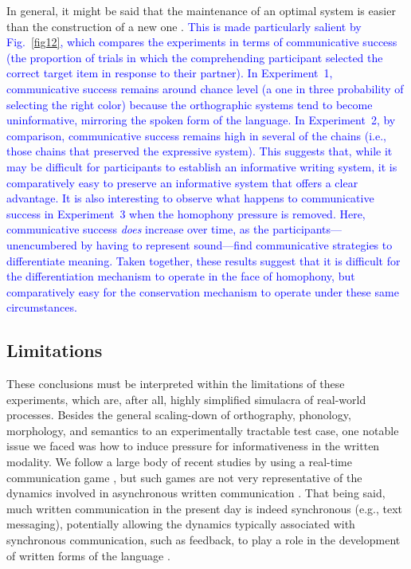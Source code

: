 \documentclass[doc,biblatex]{apa7}
\newcommand\newmaterial[1]{\textcolor{blue}{#1}}
\begin{document}
In general, it might be said that the maintenance of an optimal system is easier than the construction of a new one \parencite[see also][]{Smith:2002}. \newmaterial{This is made particularly salient by Fig.~\ref{fig12}, which compares the experiments in terms of communicative success (the proportion of trials in which the comprehending participant selected the correct target item in response to their partner). In Experiment~1, communicative success remains around chance level (a one in three probability of selecting the right color) because the orthographic systems tend to become uninformative, mirroring the spoken form of the language. In Experiment~2, by comparison, communicative success remains high in several of the chains (i.e., those chains that preserved the expressive system). This suggests that, while it may be difficult for participants to establish an informative writing system, it is comparatively easy to preserve an informative system that offers a clear advantage. It is also interesting to observe what happens to communicative success in Experiment~3 when the homophony pressure is removed. Here, communicative success \textit{does} increase over time, as the participants---unencumbered by having to represent sound---find communicative strategies to differentiate meaning. Taken together, these results suggest that it is difficult for the differentiation mechanism to operate in the face of homophony, but comparatively easy for the conservation mechanism to operate under these same circumstances.}

\subsection{Limitations}

These conclusions must be interpreted within the limitations of these experiments, which are, after all, highly simplified simulacra of real-world processes. Besides the general scaling-down of orthography, phonology, morphology, and semantics to an experimentally tractable test case, one notable issue we faced was how to induce pressure for informativeness in the written modality. We follow a large body of recent studies by using a real-time communication game \parencite[e.g.,][]{Carr:2017, Kanwal:2017, Kirby:2015, Raviv:2018, Saldana:2019, Silvey:2019, Winters:2015}, but such games are not very representative of the dynamics involved in asynchronous written communication \parencite[although see][for some approaches]{Winters:2019}. That being said, much written communication in the present day is indeed synchronous (e.g., text messaging), potentially allowing the dynamics typically associated with synchronous communication, such as feedback, to play a role in the development of written forms of the language \parencite{Lupyan:2016}.
\end{document}
